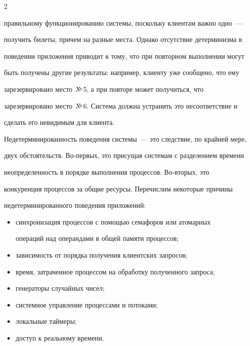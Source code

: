 \begin{multicols}{2}
{правильному функционированию сис\-те\-мы, поскольку клиентам важно одно~---

получить билеты, причем на разные места. Однако отсутствие детерминизма в

поведении  приложения приводит к тому, что при повторном выполнении могут

быть получены другие результаты: например, клиенту уже сообщено, что ему

зарезервировано место~№\,5, а при повторе может получиться, что

зарезервировано место~№\,6. Система должна устранить это несоответствие и

сделать его невидимым для клиента.



Недетерминированность поведения сис\-те\-мы~--- это следствие, по крайней мере,

двух обстоятельств. Во-первых, это присущая сис\-те\-мам с разделением времени

неопределенность в порядке выполнения процессов. Во-вторых, это

конкуренция процессов за общие ресурсы. Перечислим некоторые причины

недетерминированного поведения приложений:

{ %



}



\noindent

\begin{itemize}

\item синхронизация процессов с помощью семафоров или атомарных

операций над операндами в общей памяти процессов;

\item зависимость от порядка получения клиентских запросов;

\item время, затраченное процессом на обработку полученного запроса;

\item генераторы случайных чисел;

\item системное управление процессами и потоками;

\item локальные таймеры;

\item доступ к реальному времени.


\end{itemize}}
\end{multicols}
